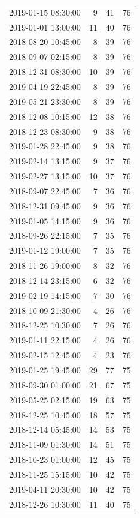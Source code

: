 \begin{tabular}{lrrr}
2019-01-15 08:30:00 & 9 & 41 & 76 \\
2019-01-01 13:00:00 & 11 & 40 & 76 \\
2018-08-20 10:45:00 & 8 & 39 & 76 \\
2018-09-07 02:15:00 & 8 & 39 & 76 \\
2018-12-31 08:30:00 & 10 & 39 & 76 \\
2019-04-19 22:45:00 & 8 & 39 & 76 \\
2019-05-21 23:30:00 & 8 & 39 & 76 \\
2018-12-08 10:15:00 & 12 & 38 & 76 \\
2018-12-23 08:30:00 & 9 & 38 & 76 \\
2019-01-28 22:45:00 & 9 & 38 & 76 \\
2019-02-14 13:15:00 & 9 & 37 & 76 \\
2019-02-27 13:15:00 & 10 & 37 & 76 \\
2018-09-07 22:45:00 & 7 & 36 & 76 \\
2018-12-31 09:45:00 & 9 & 36 & 76 \\
2019-01-05 14:15:00 & 9 & 36 & 76 \\
2018-09-26 22:15:00 & 7 & 35 & 76 \\
2019-01-12 19:00:00 & 7 & 35 & 76 \\
2018-11-26 19:00:00 & 8 & 32 & 76 \\
2018-12-14 23:15:00 & 6 & 32 & 76 \\
2019-02-19 14:15:00 & 7 & 30 & 76 \\
2018-10-09 21:30:00 & 4 & 26 & 76 \\
2018-12-25 10:30:00 & 7 & 26 & 76 \\
2019-01-11 22:15:00 & 4 & 26 & 76 \\
2019-02-15 12:45:00 & 4 & 23 & 76 \\
2019-01-25 19:45:00 & 29 & 77 & 75 \\
2018-09-30 01:00:00 & 21 & 67 & 75 \\
2019-05-25 02:15:00 & 19 & 63 & 75 \\
2018-12-25 10:45:00 & 18 & 57 & 75 \\
2018-12-14 05:45:00 & 14 & 53 & 75 \\
2018-11-09 01:30:00 & 14 & 51 & 75 \\
2018-10-23 01:00:00 & 12 & 45 & 75 \\
2018-11-25 15:15:00 & 10 & 42 & 75 \\
2019-04-11 20:30:00 & 10 & 42 & 75 \\
2018-12-26 10:30:00 & 11 & 40 & 75 \\

\end{tabular}

